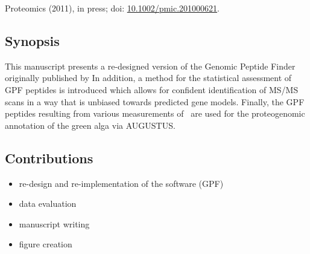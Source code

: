 Proteomics (2011), in press; doi: \href{http://dx.doi.org/10.1002/pmic.201000621}{10.1002/pmic.201000621}.

\label{paper:gpf}

\subsection*{Synopsis}

This manuscript presents a re-designed version of the Genomic Peptide Finder
originally published by \citeauthor{Allmer2004} 
In addition, a method for the statistical assessment of GPF peptides is
introduced which allows for confident identification of MS/MS scans in a
way that is unbiased towards predicted gene models.
Finally, the GPF peptides resulting from various measurements of \cre~are used 
for the proteogenomic annotation of the green alga via AUGUSTUS.

\subsection*{Contributions}

\begin{itemize}
\item re-design and re-implementation of the software (GPF)
\item data evaluation
\item manuscript writing
\item figure creation
\end{itemize}

\cleardoublepage
{}

% 
% 
% 

